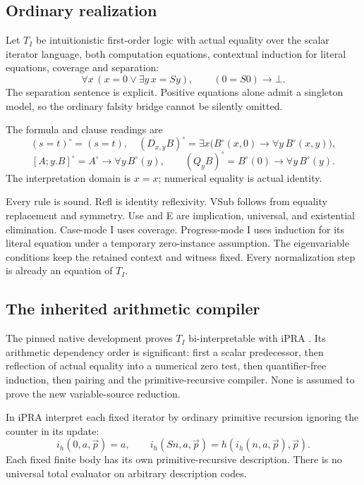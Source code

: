 \documentclass[11pt]{article}
\theoremstyle{definition}
\theoremstyle{remark}
\begin{document}
\subsection{Ordinary realization}

Let $T_I$ be intuitionistic first-order logic with actual equality over
the scalar iterator language, both computation equations, contextual
induction for literal equations, coverage and separation:
\[
 \forall x\,(x=0\lor\exists y\,x=Sy),\qquad
 (0=S0)\to\bot.
\]
The separation sentence is explicit. Positive equations alone admit a
singleton model, so the ordinary falsity bridge cannot be silently omitted.

The formula and clause readings are
\[
 (s=t)^\circ=(s=t),\quad
 (D_{x,y}B)^\circ=\exists x\bigl(B^\circ(x,0)\to\forall y\,B^\circ(x,y)\bigr),
\]
\[
 [A;y.B]^\circ=A^\circ\to\forall y\,B^\circ(y),\qquad
 (Q_yB)^\circ=B^\circ(0)\to\forall y\,B^\circ(y).
\]
The interpretation domain is $x=x$; numerical equality is actual identity.

Every rule is sound. Refl is identity reflexivity. VSub follows from
equality replacement and symmetry. Use and E are implication, universal,
and existential elimination. Case-mode I uses coverage. Progress-mode I
uses induction for its literal equation under a temporary zero-instance
assumption. The eigenvariable conditions keep the retained context and
witness fixed. Every normalization step is already an equation of $T_I$.

\subsection{The inherited arithmetic compiler}

The pinned native development proves $T_I$ bi-interpretable with iPRA
\cite{repo,bridge}. Its arithmetic dependency order is significant:
first a scalar predecessor, then reflection of actual equality into a
numerical zero test, then quantifier-free induction, then pairing and
the primitive-recursive compiler. None is assumed to prove the new
variable-source reduction.

In iPRA interpret each fixed iterator by ordinary primitive recursion
ignoring the counter in its update:
\[
 i_h(0,a,\vec p)=a,\qquad
 i_h(Sn,a,\vec p)=h(i_h(n,a,\vec p),\vec p).
\]
Each fixed finite body has its own primitive-recursive description.
There is no universal total evaluator on arbitrary description codes.
\end{document}
